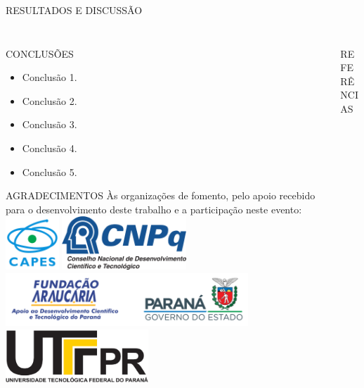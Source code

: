 \documentclass[%
  final,%
  english,%
  brazilian,%
]{beamer}
\begin{document}
\begin{frame}[t, fragile = singleslide]
\begin{columns}[t, onlytextwidth]
\begin{column}{\textwidth}
\begin{block}{RESULTADOS E DISCUSSÃO}
\begin{column}[T]{0.33\textwidth}
\begin{figure}[!htb]
\end{figure}
\end{column}
\end{block}
%
\end{column}
%
\end{columns}

\begin{columns}[t, onlytextwidth]
%
\begin{column}{0.49\textwidth}
%
\begin{block}{CONCLUSÕES}
\begin{itemize}
\item Conclusão 1.
\item Conclusão 2.
\item Conclusão 3.
\item Conclusão 4.
\item Conclusão 5.
\end{itemize}
\end{block}
%
\begin{block}{AGRADECIMENTOS}
\footnotesize%
Às organizações de fomento, pelo apoio recebido para o desenvolvimento deste trabalho e a participação neste evento:
\vfill%
\includegraphics[height = 20mm]{./Logos/apoio-capes}
\hspace*{5mm}
\includegraphics[height = 20mm]{./Logos/apoio-cnpq}
\hspace*{5mm}
\includegraphics[height = 20mm]{./Logos/apoio-fa-gov-pr}
\hspace*{5mm}
\includegraphics[height = 20mm]{./Logos/utfpr}
\end{block}
%
\end{column}
%
\begin{column}{0.49\textwidth}
%
\begin{block}{REFERÊNCIAS}
\printbibliography[heading = none]
\end{block}
%
\end{column}
%
\end{columns}


\end{frame}
\end{document}
